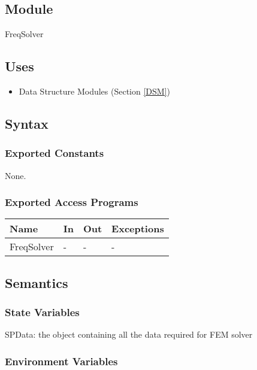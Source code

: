 \documentclass[12pt, titlepage]{article}
\begin{document}
	
	\subsection{Module} FreqSolver
	
	
	\subsection{Uses} \begin{itemize} \item Data Structure Modules (Section
		\ref{DSM}) \end{itemize}
	
	\subsection{Syntax}
	
	\subsubsection{Exported Constants} None. \subsubsection{Exported Access
		Programs}
	
	\begin{center} \begin{tabular}{p{2cm} p{4cm} p{4cm} p{2cm}} \hline \textbf{Name}
			& \textbf{In} & \textbf{Out} & \textbf{Exceptions} \\ \hline FreqSolver & - & -
			& - \\ \hline \end{tabular} \end{center}
	
	\subsection{Semantics}
	
	\subsubsection{State Variables}
	
	SPData: the object containing all the data required for FEM solver
	
	\subsubsection{Environment Variables}
	
\end{document}
